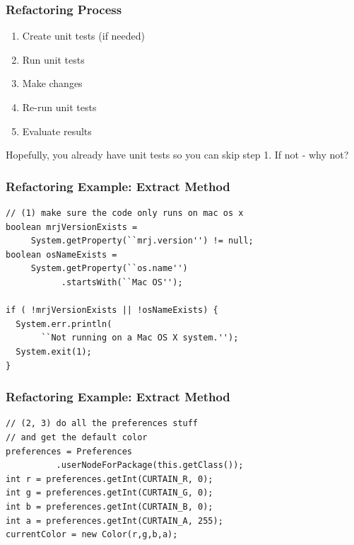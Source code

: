 \begin{frame}
\frametitle{Refactoring Process}
\begin{changemargin}{1cm}

\begin{enumerate}
	\item Create unit tests (if needed)
	\item Run unit tests
	\item Make changes
	\item Re-run unit tests
	\item Evaluate results
\end{enumerate}

Hopefully, you already have unit tests so you can skip step 1. If not - why not?

\end{changemargin}
\end{frame}



\begin{frame}[fragile]
\frametitle{Refactoring Example: Extract Method}
\begin{changemargin}{1cm}

\begin{verbatim}
// (1) make sure the code only runs on mac os x
boolean mrjVersionExists = 
     System.getProperty(``mrj.version'') != null;
boolean osNameExists = 
     System.getProperty(``os.name'')
           .startsWith(``Mac OS'');

if ( !mrjVersionExists || !osNameExists) {
  System.err.println(
       ``Not running on a Mac OS X system.'');
  System.exit(1);
}
\end{verbatim}
\end{changemargin}
\end{frame}

\begin{frame}[fragile]
\frametitle{Refactoring Example: Extract Method}
\begin{changemargin}{1cm}

\begin{verbatim}
// (2, 3) do all the preferences stuff
// and get the default color
preferences = Preferences
          .userNodeForPackage(this.getClass());
int r = preferences.getInt(CURTAIN_R, 0);
int g = preferences.getInt(CURTAIN_G, 0);
int b = preferences.getInt(CURTAIN_B, 0);
int a = preferences.getInt(CURTAIN_A, 255);
currentColor = new Color(r,g,b,a);
\end{verbatim}



\end{changemargin}
\end{frame}


